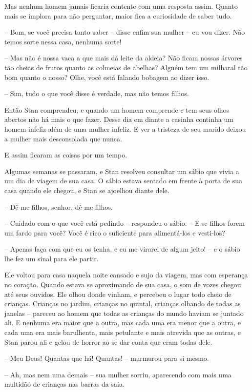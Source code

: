 Mas nenhum homem jamais ficaria contente com uma resposta assim.
Quanto mais se implora para não perguntar, maior fica a curiosidade
de saber tudo.

-- Bom, se você precisa tanto saber -- disse enfim sua mulher -- eu vou
dizer. Não temos sorte nessa casa, nenhuma sorte!

-- Mas não é nossa vaca a que mais dá leite da aldeia? Não ficam nossas
árvores tão cheias de frutos quanto as colmeias de abelhas? Alguém
tem um milharal tão bom quanto o nosso? Olhe, você está falando
bobagem ao dizer isso.

-- Sim, tudo o que você disse é verdade, mas não temos filhos.

Então Stan comprendeu, e quando um homem comprende e tem seus olhos
abertos não há mais o que fazer. Desse dia em diante a casinha
continha um homem infeliz além de uma mulher infeliz. E ver a
tristeza de seu marido deixou a mulher mais desconsolada que nunca.

E assim ficaram as coisas por um tempo.

Algumas semanas se passaram, e Stan resolveu consultar um sábio que
vivia a um dia de viagem de sua casa. O sábio estava sentado em
frente à porta de sua casa quando ele chegou, e Stan se ajoelhou
diante dele.

-- Dê-me filhos, senhor, dê-me filhos.

-- Cuidado com o que você está pedindo -- respondeu o sábio. -- E se
filhos forem um fardo para você? Você é rico o suficiente para
alimentá-los e vesti-los? 

-- Apenas faça com que eu os tenha, e eu me virarei de algum jeito! -- e
o sábio lhe fez um sinal para ele partir.

Ele voltou para casa naquela noite cansado e sujo da viagem, mas com
esperança no coração. Quando estava se aproximando de sua casa, o som
de vozes chegou até seus ouvidos. Ele olhou donde vinham, e percebeu
o lugar todo cheio de crianças. Crianças no jardim, crianças no
quintal, crianças olhando de todas as janelas -- pareceu ao homem que
todas as crianças do mundo haviam se juntado ali. E nenhuma era maior
que a outra, mas cada uma era menor que a outra, e cada uma era mais
barulhenta, mais petulante e mais atrevida que as outras, e Stan
parou ali e gelou de horror ao se dar conta que eram todas dele.

-- Meu Deus! Quantas que há! Quantas! -- murmurou para si mesmo.

-- Ah, mas nem uma demais -- sua mulher sorriu, aparecendo com mais uma
multidão de crianças nas barras da saia.

